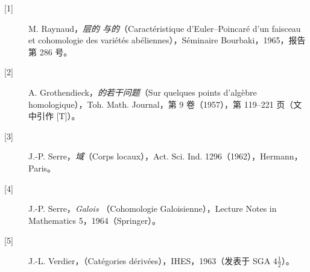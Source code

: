 \begin{description}
\item[{[1]}] M. Raynaud，\emph{层的 与的}（Caractéristique d'Euler--Poincaré d'un faisceau et cohomologie des variétés abéliennes），Séminaire Bourbaki，1965，报告第 286 号。
\item[{[2]}] A. Grothendieck，\emph{的若干问题}（Sur quelques points d'algèbre homologique），Toh. Math. Journal，第 9 卷（1957），第 119--221 页（文中引作 [T]）。
\item[{[3]}] J.-P. Serre，\emph{域}（Corps locaux），Act. Sci. Ind. 1296（1962），Hermann，Paris。
\item[{[4]}] J.-P. Serre，\emph{Galois }（Cohomologie Galoisienne），Lecture Notes in Mathematics 5，1964（Springer）。
\item[{[5]}] J.-L. Verdier，\emph{}（Catégories dérivées），IHES，1963（发表于 SGA $4\frac12$）。
\end{description}
